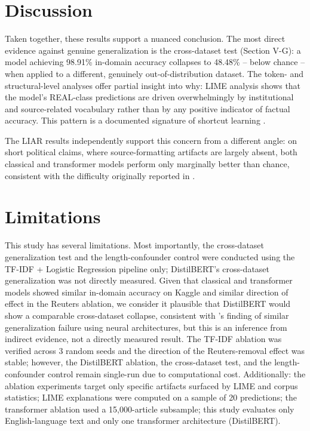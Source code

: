 \documentclass[conference]{IEEEtran}
\begin{document}
\section{Discussion}
Taken together, these results support a nuanced conclusion. The most direct evidence against genuine generalization is the cross-dataset test (Section V-G): a model achieving 98.91\% in-domain accuracy collapses to 48.48\% -- below chance -- when applied to a different, genuinely out-of-distribution dataset. The token- and structural-level analyses offer partial insight into why: LIME analysis shows that the model's REAL-class predictions are driven overwhelmingly by institutional and source-related vocabulary rather than by any positive indicator of factual accuracy. This pattern is a documented signature of shortcut learning \cite{geirhos2020}.

The LIAR results independently support this concern from a different angle: on short political claims, where source-formatting artifacts are largely absent, both classical and transformer models perform only marginally better than chance, consistent with the difficulty originally reported in \cite{wang2017}.

\section{Limitations}
This study has several limitations. Most importantly, the cross-dataset generalization test and the length-confounder control were conducted using the TF-IDF + Logistic Regression pipeline only; DistilBERT's cross-dataset generalization was not directly measured. Given that classical and transformer models showed similar in-domain accuracy on Kaggle and similar direction of effect in the Reuters ablation, we consider it plausible that DistilBERT would show a comparable cross-dataset collapse, consistent with \cite{hoy2022}'s finding of similar generalization failure using neural architectures, but this is an inference from indirect evidence, not a directly measured result. The TF-IDF ablation was verified across 3 random seeds and the direction of the Reuters-removal effect was stable; however, the DistilBERT ablation, the cross-dataset test, and the length-confounder control remain single-run due to computational cost. Additionally: the ablation experiments target only specific artifacts surfaced by LIME and corpus statistics; LIME explanations were computed on a sample of 20 predictions; the transformer ablation used a 15,000-article subsample; this study evaluates only English-language text and only one transformer architecture (DistilBERT).
\end{document}
